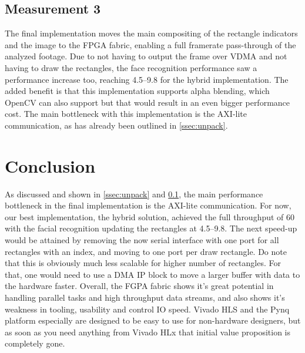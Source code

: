 \documentclass[conference]{IEEEtran}
\begin{document}
\subsection{Measurement 3}
\label{ssec:measurement-3}
The final implementation moves the main compositing of the rectangle indicators and the image to the FPGA fabric, enabling a full framerate pass-through of the analyzed footage. Due to not having to output the frame over VDMA and not having to draw the rectangles, the face recognition performance saw a performance increase too, reaching \SIrange{4.5}{9.8}{\fps} for the hybrid implementation. The added benefit is that this implementation supports alpha blending, which OpenCV can also support but that would result in an even bigger performance cost. The main bottleneck with this implementation is the AXI-lite communication, as has already been outlined in \cref{ssec:unpack}.

\section{Conclusion}
As discussed and shown in \cref{ssec:unpack} and \cref{ssec:measurement-3}, the main performance bottleneck in the final implementation is the AXI-lite communication. For now, our best implementation, the hybrid solution, achieved the full throughput of \SI{60}{\fps} with the facial recognition updating the rectangles at \SIrange{4.5}{9.8}{\fps}. The next speed-up would be attained by removing the now serial interface with one port for all rectangles with an index, and moving to one port per draw rectangle. Do note that this is obviously much less scalable for higher number of rectangles. For that, one would need to use a DMA IP block to move a larger buffer with data to the hardware faster. Overall, the FGPA fabric shows it's great potential in handling parallel tasks and high throughput data streams, and also shows it's weakness in tooling, usability and control IO speed. Vivado HLS and the Pynq platform especially are designed to be easy to use for non-hardware designers, but as soon as you need anything from Vivado HLx that initial value proposition is completely gone.



\printbibliography

\end{document}
